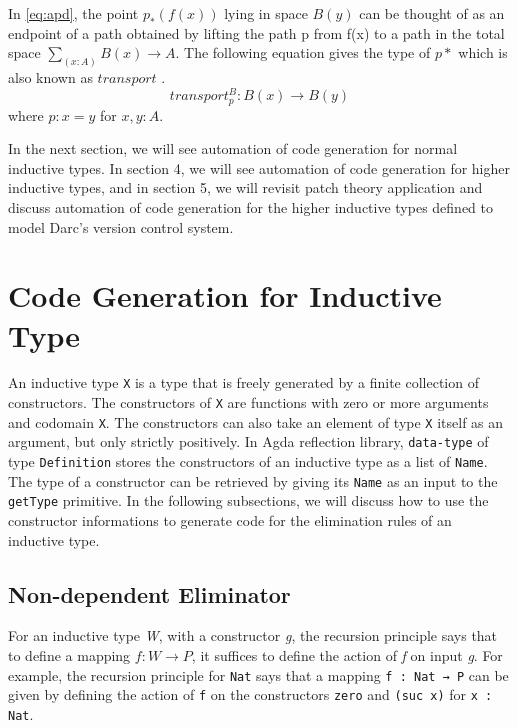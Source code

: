\documentclass[sigplan,10pt]{acmart}
\begin{document}
In \eqref{eq:apd}, the point $p_*(f(x))$ lying in space $B(y)$ can be thought of as an endpoint of a path obtained by lifting the path p from f(x) to a path in the total space $\sum_{(x:A)} B(x) \rightarrow A$. The following equation gives the type of $p*$ which is also known as $transport$ \cite{HoTT-2013}.
\begin{equation} \label{eq:transport}
	transport^B_p : B(x) \rightarrow B(y)
\end{equation}
where $p : x = y$ for $x,y : A$.

In the next section, we will see automation of code generation for normal inductive types. In section 4, we will see automation of code generation for higher inductive types, and in section 5, we will revisit patch theory \citep{Angiuli-2014} application and discuss automation of code generation for the higher inductive types defined to model Darc's version control system.

\section{Code Generation for Inductive Type}
\label{sec:sec3}
An inductive type {\tt X} is a type that is freely generated by a finite collection of constructors. The constructors of {\tt X} are functions with zero or more arguments and codomain {\tt X}. The constructors can also take an element of type {\tt X} itself as an argument, but only strictly positively. In Agda reflection library, {\tt data-type} of type {\tt Definition} stores the constructors of an inductive type as a list of {\tt Name}. The type of a constructor can be retrieved by giving its {\tt Name} as an input to the {\tt getType} primitive. In the following subsections, we will discuss how to use the constructor informations to generate code for the elimination rules of an inductive type. 

\subsection{Non-dependent Eliminator}
\label{sec:sec3.1}

For an inductive type \emph{W}, with a constructor \emph{g}, the recursion principle says that to define a mapping $f : W \rightarrow P$, it suffices to define the action of \emph{f} on input \emph{g}. For example, the recursion principle for {\tt Nat} says that a mapping {\tt f : Nat → P} can be given by defining the action of {\tt f} on the constructors {\tt zero} and {\tt (suc x)} for {\tt x : Nat}. 
\end{document}
